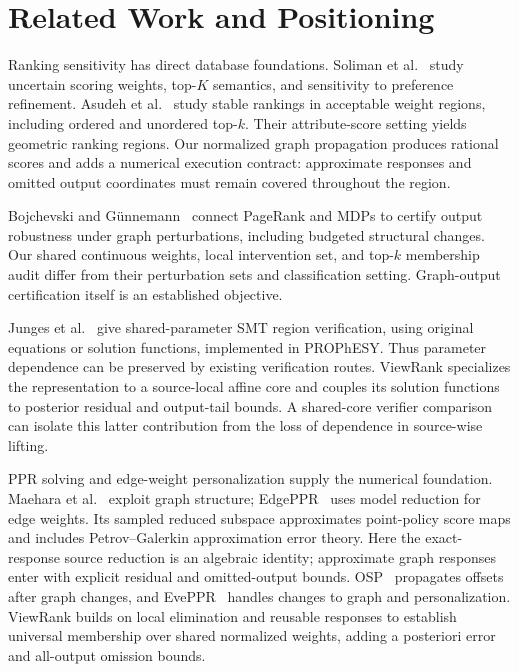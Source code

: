 \documentclass[conference]{IEEEtran}
\begin{document}






\section{Related Work and Positioning}
\label{sec:related}
Ranking sensitivity has direct database foundations. Soliman et al.~\cite{uncertainranking} study uncertain scoring weights, top-$K$ semantics, and sensitivity to preference refinement. Asudeh et al.~\cite{stablerankings} study stable rankings in acceptable weight regions, including ordered and unordered top-$k$. Their attribute-score setting yields geometric ranking regions. Our normalized graph propagation produces rational scores and adds a numerical execution contract: approximate responses and omitted output coordinates must remain covered throughout the region.

Bojchevski and G\"unnemann~\cite{graphcert} connect PageRank and MDPs to certify output robustness under graph perturbations, including budgeted structural changes. Our shared continuous weights, local intervention set, and top-$k$ membership audit differ from their perturbation sets and classification setting. Graph-output certification itself is an established objective.

Junges et al.~\cite{junges2024} give shared-parameter SMT region verification, using original equations or solution functions, implemented in PROPhESY. Thus parameter dependence can be preserved by existing verification routes. ViewRank specializes the representation to a source-local affine core and couples its solution functions to posterior residual and output-tail bounds. A shared-core verifier comparison can isolate this latter contribution from the loss of dependence in source-wise lifting.

PPR solving and edge-weight personalization supply the numerical foundation. Maehara et al.~\cite{maehara} exploit graph structure; EdgePPR~\cite{edgeppr} uses model reduction for edge weights. Its sampled reduced subspace approximates point-policy score maps and includes Petrov--Galerkin approximation error theory. Here the exact-response source reduction is an algebraic identity; approximate graph responses enter with explicit residual and omitted-output bounds. OSP~\cite{osp} propagates offsets after graph changes, and EvePPR~\cite{eveppr} handles changes to graph and personalization. ViewRank builds on local elimination and reusable responses to establish universal membership over shared normalized weights, adding a posteriori error and all-output omission bounds.
\end{document}
